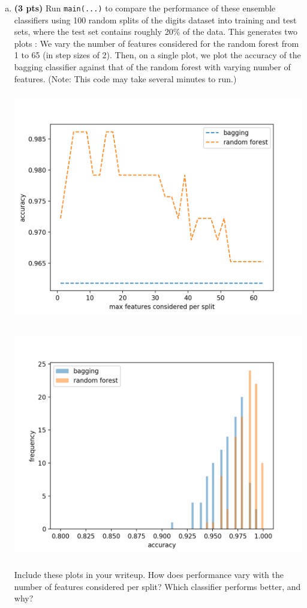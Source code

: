 \documentclass[11pt]{article}
\begin{document}
\begin{enumerate}[(a)]
	\item \textbf{(3 pts)} Run \verb+main(...)+ to compare the performance of these ensemble classifiers using 100 random splits of the digits dataset into training and test sets, where the test set contains roughly 20\% of the data. This generates two plots : 
We vary the number of features considered for the random forest from 1 to 65 (in step sizes of 2). Then, on a single plot, we plot the accuracy of the bagging classifier against that of the random forest with varying number of features. (Note: This code may take several minutes to run.)

\begin{center}
\includegraphics[width = 15cm, height = 10cm]{bag_vs_rf.png}
\end{center}

\begin{center}
\includegraphics[width = 15cm, height = 10cm]{accuracy.png}
\end{center}
Include these plots in your writeup. How does performance vary with the number of features considered per split? Which classifier performs better, and why?


\end{enumerate}
\end{document}
